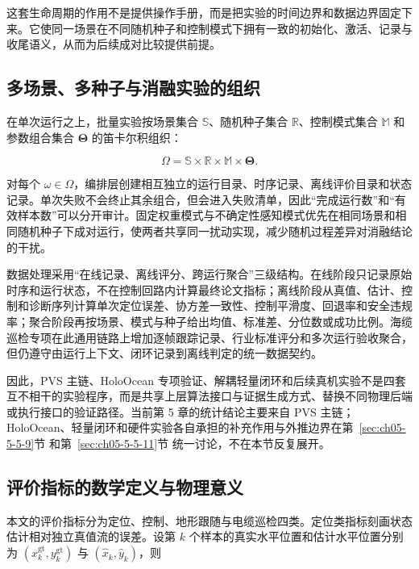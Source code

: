 这套生命周期的作用不是提供操作手册，而是把实验的时间边界和数据边界固定下来。它使同一场景在不同随机种子和控制模式下拥有一致的初始化、激活、记录与收尾语义，从而为后续成对比较提供前提。

\subsection{多场景、多种子与消融实验的组织}\label{sec:ch05-5-1-3}

在单次运行之上，批量实验按场景集合 \(\mathbb{S}\)、随机种子集合 \(\mathbb{R}\)、控制模式集合 \(\mathbb{M}\) 和参数组合集合 \(\boldsymbol{\Theta}\) 的笛卡尔积组织：

\begin{equation}
\Omega
=
\mathbb{S}\times\mathbb{R}\times\mathbb{M}\times\boldsymbol{\Theta}.
\label{eq:ch05-experiment-space}
\end{equation}

对每个 \(\omega\in\Omega\)，编排层创建相互独立的运行目录、时序记录、离线评价目录和状态记录。单次失败不会终止其余组合，但会进入失败清单，因此``完成运行数''和``有效样本数''可以分开审计。固定权重模式与不确定性感知模式优先在相同场景和相同随机种子下成对运行，使两者共享同一扰动实现，减少随机过程差异对消融结论的干扰。

数据处理采用``在线记录、离线评分、跨运行聚合''三级结构。在线阶段只记录原始时序和运行状态，不在控制回路内计算最终论文指标；离线阶段从真值、估计、控制和诊断序列计算单次定位误差、协方差一致性、控制平滑度、回退率和安全违规率；聚合阶段再按场景、模式与种子给出均值、标准差、分位数或成功比例。海缆巡检专项在此通用链路上增加逐帧跟踪记录、行业标准评分和多次运行验收聚合，但仍遵守由运行上下文、闭环记录到离线判定的统一数据契约。

因此，PVS 主链、HoloOcean 专项验证、解耦轻量闭环和后续真机实验不是四套互不相干的实验程序，而是共享上层算法接口与证据生成方式、替换不同物理后端或执行接口的验证路径。当前第 5 章的统计结论主要来自 PVS 主链；HoloOcean、轻量闭环和硬件实验各自承担的补充作用与外推边界在第~\ref{sec:ch05-5-5-9}节 和第~\ref{sec:ch05-5-5-11}节 统一讨论，不在本节反复展开。

\subsection{评价指标的数学定义与物理意义}\label{sec:ch05-5-1-4}

本文的评价指标分为定位、控制、地形跟随与电缆巡检四类。定位类指标刻画状态估计相对独立真值流的误差。设第 \(k\) 个样本的真实水平位置和估计水平位置分别为 \((x_k^{\mathrm{gt}},y_k^{\mathrm{gt}})\) 与 \((\hat{x}_k,\hat{y}_k)\)，则


